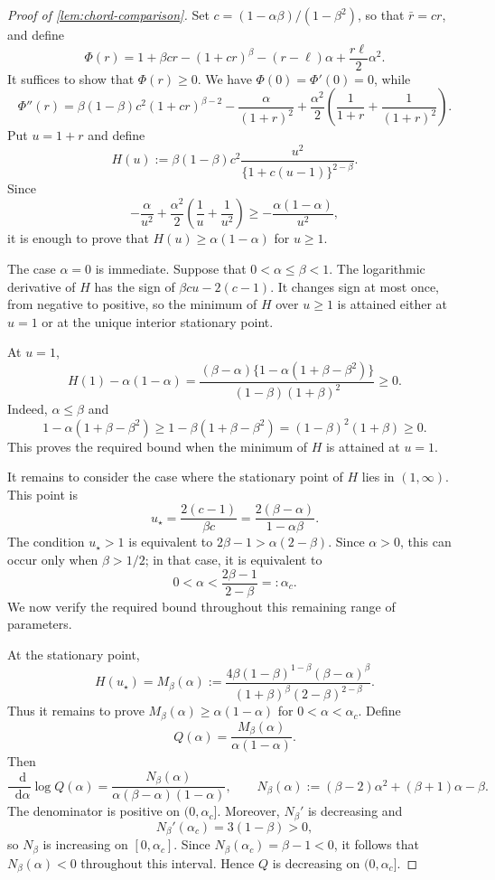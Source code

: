 \documentclass[10pt,a4paper]{amsart}
\newcommand*\dif{\mathop{}\!\mathrm{d}}
\begin{document}
\begin{proof}[Proof of \cref{lem:chord-comparison}]
Set $c=(1-\alpha\beta)/(1-\beta^2)$, so that $\bar r=cr$, and define
\[
  \Phi(r)=1+\beta cr-(1+cr)^\beta-(r-\ell)\alpha+\frac{r\ell}{2}\alpha^2.
\]
It suffices to show that $\Phi(r)\geq0$. We have $\Phi(0)=\Phi'(0)=0$, while
\[
  \Phi''(r)=\beta(1-\beta)c^2(1+cr)^{\beta-2}-\frac{\alpha}{(1+r)^2}+\frac{\alpha^2}{2}\left(\frac1{1+r}+\frac1{(1+r)^2}\right).
\]
Put $u=1+r$ and define
\[
  H(u):=\beta(1-\beta)c^2\frac{u^2}{\{1+c(u-1)\}^{2-\beta}}.
\]
Since
\[
  -\frac{\alpha}{u^2}+\frac{\alpha^2}{2}\left(\frac1u+\frac1{u^2}\right)\geq-\frac{\alpha(1-\alpha)}{u^2},
\]
it is enough to prove that $H(u)\geq\alpha(1-\alpha)$ for $u\geq1$.

The case $\alpha=0$ is immediate. Suppose that $0<\alpha\leq\beta<1$. The logarithmic derivative of $H$ has the sign of $\beta cu-2(c-1)$. It changes sign at most once, from negative to positive, so the minimum of $H$ over $u\geq1$ is attained either at $u=1$ or at the unique interior stationary point.

At $u=1$,
\[
  H(1)-\alpha(1-\alpha)=\frac{(\beta-\alpha)\{1-\alpha(1+\beta-\beta^2)\}}{(1-\beta)(1+\beta)^2}\geq0.
\]
Indeed, $\alpha\leq\beta$ and
\[
  1-\alpha(1+\beta-\beta^2)\geq1-\beta(1+\beta-\beta^2)=(1-\beta)^2(1+\beta)\geq0.
\]
This proves the required bound when the minimum of $H$ is attained at $u=1$.

It remains to consider the case where the stationary point of $H$ lies in $(1,\infty)$. This point is
\[
  u_\star=\frac{2(c-1)}{\beta c}=\frac{2(\beta-\alpha)}{1-\alpha\beta}.
\]
The condition $u_\star>1$ is equivalent to $2\beta-1>\alpha(2-\beta)$. Since $\alpha>0$, this can occur only when $\beta>1/2$; in that case, it is equivalent to
\[
  0<\alpha<\frac{2\beta-1}{2-\beta}=:\alpha_c.
\]
We now verify the required bound throughout this remaining range of parameters.

At the stationary point,
\[
  H(u_\star)=M_\beta(\alpha):=\frac{4\beta(1-\beta)^{1-\beta}(\beta-\alpha)^\beta}{(1+\beta)^\beta(2-\beta)^{2-\beta}}.
\]
Thus it remains to prove $M_\beta(\alpha)\geq\alpha(1-\alpha)$ for $0<\alpha<\alpha_c$. Define
\[
  Q(\alpha)=\frac{M_\beta(\alpha)}{\alpha(1-\alpha)}.
\]
Then
\[
  \frac{\dif}{\dif\alpha}\log Q(\alpha)=\frac{N_\beta(\alpha)}{\alpha(\beta-\alpha)(1-\alpha)}, \qquad N_\beta(\alpha):=(\beta-2)\alpha^2+(\beta+1)\alpha-\beta.
\]
The denominator is positive on $(0,\alpha_c]$. Moreover, $N_\beta'$ is decreasing and
\[
  N_\beta'(\alpha_c)=3(1-\beta)>0,
\]
so $N_\beta$ is increasing on $[0,\alpha_c]$. Since $N_\beta(\alpha_c)=\beta-1<0$, it follows that $N_\beta(\alpha)<0$ throughout this interval. Hence $Q$ is decreasing on $(0,\alpha_c]$.


\end{proof}
\end{document}
